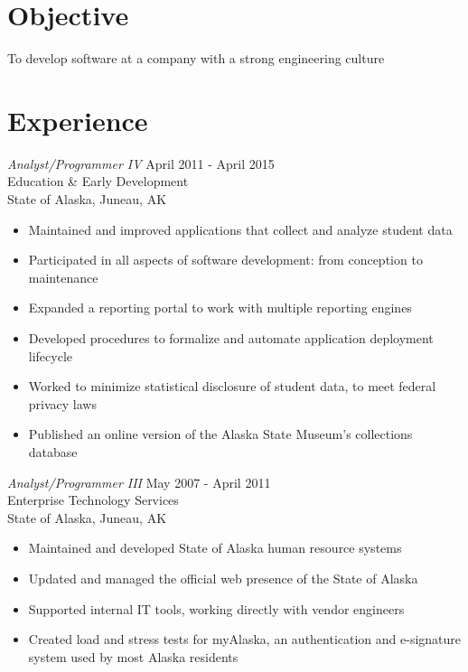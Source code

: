 \documentclass[line,margin]{res}
\begin{document}
\address{\href{mailto:amiller@alumni.uidaho.edu}{amiller@alumni.uidaho.edu}\\ (253) 336-6451}
\address{Juneau, AK 99801}
 
\begin{resume}
 
\section{Objective}       To develop software at a company with a strong engineering culture

\section{Experience} {\sl Analyst/Programmer IV} \hfill April 2011 - April 2015 \\
		Education \& Early Development \\
                State of Alaska, Juneau, AK
                \begin{itemize}  \itemsep -2pt %
		\item Maintained and improved applications that collect and analyze student data
		\item Participated in all aspects of software development: from conception to maintenance
		\item Expanded a reporting portal to work with multiple reporting engines
		\item Developed procedures to formalize and automate application deployment lifecycle
		\item Worked to minimize statistical disclosure of student data, to meet federal privacy laws
		\item Published an online version of the  Alaska State Museum's collections database
                \end{itemize}

		{\sl Analyst/Programmer III} \hfill May 2007 - April 2011 \\
                Enterprise Technology Services \\
                State of Alaska, Juneau, AK
                \begin{itemize}  \itemsep -2pt %
		\item Maintained and developed State of Alaska human resource systems
		\item Updated and managed the official web presence of the State of Alaska
		\item Supported internal IT tools, working directly with vendor engineers
		\item Created load and stress tests for myAlaska, an authentication and e-signature system used by most Alaska residents
                \end{itemize}
 

\end{resume}
\end{document}
